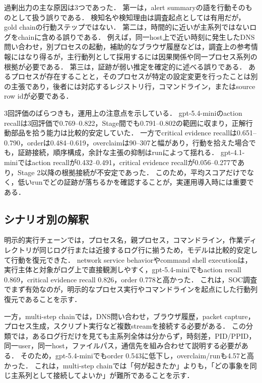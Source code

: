 \documentclass[a4paper,twocolumn,10pt]{article}
\newcommand{\code}[1]{{\small\ttfamily #1}}
\begin{document}
過剰出力の主な原因は3つであった．
第一は，alert summaryの語を行動そのものとして扱う誤りである．
検知名や検知理由は調査起点としては有用だが，gold chainの行動ステップではない．
第二は，時間的に近いが主系列ではないログをchainに含める誤りである．
例えば，同一host上で近い時刻に発生したDNS問い合わせ，別プロセスの起動，補助的なブラウザ履歴などは，調査上の参考情報にはなり得るが，主行動列として採用するには因果関係や同一プロセス系列の根拠が必要である．
第三は，証跡が弱い推定を確定的に述べる誤りである．
あるプロセスが存在することと，そのプロセスが特定の設定変更を行ったことは別の主張であり，後者には対応するレジストリ行，コマンドライン，またはsource row idが必要である．

3回評価のばらつきも，運用上の注意点を示している．
\code{gpt-5.4-mini}のaction recallは3回評価で0.769--0.822，Stage間でも0.791--0.802の範囲に収まり，正解行動部品を拾う能力は比較的安定していた．
一方でcritical evidence recallは0.651--0.790，orderは0.484--0.619，overclaimは90--307と幅があり，行動を拾えた場合でも，証跡接続，順序構成，余計な主張の抑制はrunによって揺れる．
\code{gpt-4.1-mini}ではaction recallが0.432--0.491，critical evidence recallが0.056--0.277であり，Stage 2以降の根拠接続が不安定であった．
このため，平均スコアだけでなく，低いrunでどの証跡が落ちるかを確認することが，実運用導入時には重要である．

\subsection{シナリオ別の解釈}

明示的実行チェーンでは，プロセス名，親プロセス，コマンドライン，作業ディレクトリが同じログ行または近接するログ行に揃うため，モデルは比較的安定して行動を復元できた．
network service behaviorやcommand shell executionは，実行主体と対象がログ上で直接観測しやすく，\code{gpt-5.4-mini}でもaction recall 0.869，critical evidence recall 0.826，order 0.778と高かった．
これは，SOC調査でまず有効なのが，明示的なプロセス実行やコマンドラインを起点にした行動列復元であることを示す．

一方，multi-step chainでは，DNS問い合わせ，ブラウザ履歴，packet capture，プロセス生成，スクリプト実行など複数streamを接続する必要がある．
この分類では，あるログ行だけを見ても主系列全体は分からず，時刻差，PID/PPID，同一user，同一host，ファイルパス，通信先を組み合わせて説明する必要がある．
そのため，\code{gpt-5.4-mini}でもorder 0.543に低下し，overclaim/runも4.57と高かった．
これは，multi-step chainでは「何が起きたか」よりも，「どの事象を同じ主系列として接続してよいか」が難所であることを示す．
\end{document}

